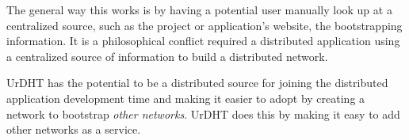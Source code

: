 \documentclass[11pt,conference]{IEEEtran}
\begin{document}
The general way this works is by having a potential user manually look up at a centralized source, such as the project or application's website, the bootstrapping information.
It is a philosophical conflict required a distributed application using a centralized source of information to build a distributed network.





UrDHT has the potential to be a distributed source for joining the distributed application development time and making it easier to adopt by creating a network to bootstrap \textit{other networks}.
UrDHT does this by making it easy to add other networks as a service.






\end{document}
